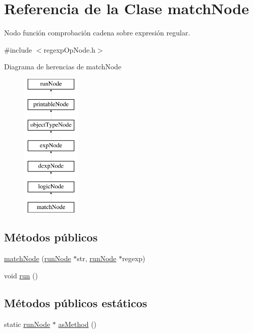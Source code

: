 \hypertarget{classmatchNode}{\section{Referencia de la Clase match\-Node}
\label{classmatchNode}
}


Nodo función comprobación cadena sobre expresión regular.  




{\ttfamily \#include $<$regexp\-Op\-Node.\-h$>$}

Diagrama de herencias de match\-Node\begin{figure}[H]
\begin{center}
\leavevmode
\includegraphics[height=7.000000cm]{classmatchNode}
\end{center}
\end{figure}
\subsection*{Métodos públicos}
\begin{DoxyCompactItemize}
\item 
\hyperlink{classmatchNode_ae145629a42d2a63e4d60c410253fe4db}{match\-Node} (\hyperlink{classrunNode}{run\-Node} $\ast$str, \hyperlink{classrunNode}{run\-Node} $\ast$regexp)
\item 
void \hyperlink{classmatchNode_a216cb0810f679bab31aa61eeaad86f9a}{run} ()
\end{DoxyCompactItemize}
\subsection*{Métodos públicos estáticos}
\begin{DoxyCompactItemize}
\item 
static \hyperlink{classrunNode}{run\-Node} $\ast$ \hyperlink{classmatchNode_aedff64c835d3552a937e3f6ab38996e1}{as\-Method} ()
\end{DoxyCompactItemize}
